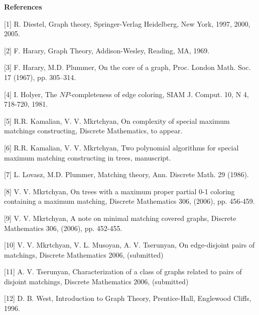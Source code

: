 \documentclass{article}
\begin{document}
\bigskip

\begin{center}
\textbf{References}\bigskip
\end{center}

[1] R. Diestel, Graph theory, Springer-Verlag Heidelberg, New York, 1997,
2000, 2005.

[2] F. Harary, Graph Theory, Addison-Wesley, Reading, MA, 1969.

[3] F. Harary, M.D. Plummer, On the core of a graph, Proc. London Math. Soc.
17 (1967), pp. 305--314.

[4] I. Holyer, The $NP$-completeness of edge coloring, SIAM J. Comput. 10, N
4, 718-720, 1981.

[5] R.R. Kamalian, V. V. Mkrtchyan, On complexity of special maximum
matchings constructing, Discrete Mathematics, to appear.

[6] R.R. Kamalian, V. V. Mkrtchyan, Two polynomial algorithms for special
maximum matching constructing in trees, manuscript.

[7] L. Lovasz, M.D. Plummer, Matching theory, Ann. Discrete Math. 29 (1986).

[8] V. V. Mkrtchyan, On trees with a maximum proper partial 0-1 coloring
containing a maximum matching, Discrete Mathematics 306, (2006), pp. 456-459.

[9] V. V. Mkrtchyan, A note on minimal matching covered graphs, Discrete
Mathematics 306, (2006), pp. 452-455.

[10] V. V. Mkrtchyan, V. L. Musoyan, A. V. Tserunyan, On edge-disjoint pairs
of matchings, Discrete Mathematics 2006, (submitted)

[11] A. V. Tserunyan, Characterization of a class of graphs related to pairs
of disjoint matchings, Discrete Mathematics 2006, (submitted)

[12] D. B. West, Introduction to Graph Theory, Prentice-Hall, Englewood
Cliffs, 1996.
\end{document}
